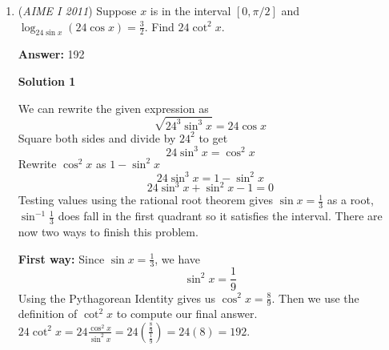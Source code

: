 \begin{enumerate}
\textbf{Solution 2}

Note that the area is given by Heron's formula and it is $20\sqrt{221}$. Let $h_i$ denote the length of the altitude dropped from vertex i. It follows that $h_b = \frac{40\sqrt{221}}{27}, h_c  = \frac{40\sqrt{221}}{30}, h_a = \frac{40\sqrt{221}}{23}$. From similar triangles we can see that $\frac{27h}{h_a}+\frac{27h}{h_c} \le 27 \rightarrow h \le \frac{h_ah_c}{h_a+h_c}$. We can see this is true for any combination of a,b,c and thus the minimum of the upper bounds for h yields $h = \frac{40\sqrt{221}}{57} \rightarrow \boxed{318}$.

 



\textbf{Solution 3}

As from above, we can see that the length of the altitude from A is the longest. Thus the highest table is formed when X and Y meet up. Let the distance of this point from B be $x$, making the distance from C $23 - x$. Let $h$ be the height of the table. From similar triangles, we have $\frac{x}{23} = \frac{h}{h_b} = \frac{27h}{2A}$ where A is the area of ABC. Similarly, $\frac{23-x}{23}=\frac{h}{h_c}=\frac{30h}{2A}$. Therefore, $1-\frac{x}{23}=\frac{30h}{2A} \rightarrow1-\frac{27h}{2A}=\frac{30h}{2A}$ and hence $h = \frac{2A}{57} = \frac{40\sqrt{221}}{57}\rightarrow \boxed{318}$.

 


	\item (\textit{AIME I 2011}) Suppose $x$ is in the interval $[0,\pi/2]$ and $\log_{24 \sin x} (24 \cos x) = \frac{3}{2}$.  Find $24 \cot^2 x$.


 
 \textbf{Answer: }192



\textbf{Solution 1}

We can rewrite the given expression as
 \[\sqrt{24^3\sin^3 x}=24\cos x\]Square both sides and divide by $24^2$ to get
 \[24\sin ^3 x=\cos ^2 x\]Rewrite $\cos ^2 x$ as $1-\sin ^2 x$
 \[24\sin ^3 x=1-\sin ^2 x\]
 \[24\sin ^3 x+\sin ^2 x - 1=0\]Testing values using the rational root theorem gives $\sin x=\frac{1}{3}$ as a root, $\sin^{-1} \frac{1}{3}$ does fall in the first quadrant so it satisfies the interval. There are now two ways to finish this problem. 

 \textbf{First way:} Since $\sin x=\frac{1}{3}$, we have
 \[\sin ^2 x=\frac{1}{9}\]Using the Pythagorean Identity gives us $\cos ^2 x=\frac{8}{9}$. Then we use the definition of $\cot ^2 x$ to compute our final answer. $24\cot ^2 x=24\frac{\cos ^2 x}{\sin ^2 x}=24\left(\frac{\frac{8}{9}}{\frac{1}{9}}\right)=24(8)=\boxed{192}$.


\end{enumerate}
